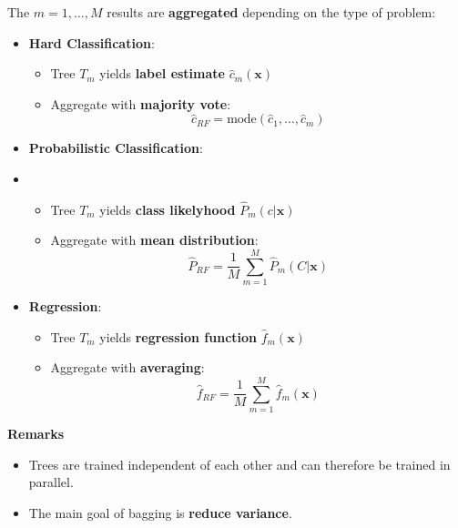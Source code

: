 \newpar{}
The $m=1,\ldots, M$ results are \textbf{aggregated} depending on the type of problem:
\begin{itemize}
    \item \textbf{Hard Classification}:
          \begin{itemize}
              \item Tree $T_m$ yields \textbf{label estimate} $\widehat{c}_m(\mathbf{x})$
              \item Aggregate with \textbf{majority vote}:
                    \noindent\begin{equation*}
                        \widehat{c}_{RF} = \mathrm{mode}(\widehat{c}_1,\ldots, \widehat{c}_m)
                    \end{equation*}
          \end{itemize}
    \item \textbf{Probabilistic Classification}:
    \item \begin{itemize}
              \item Tree $T_m$ yields \textbf{class likelyhood} $\widehat{P}_m(c|\mathbf{x})$
              \item Aggregate with \textbf{mean distribution}:
                    \noindent\begin{equation*}
                        \widehat{P}_{RF} = \frac{1}{M}\sum_{m=1}^{M}\widehat{P}_m(C|\mathbf{x})
                    \end{equation*}
          \end{itemize}
    \item \textbf{Regression}:
          \begin{itemize}
              \item Tree $T_m$ yields \textbf{regression function} $\widehat{f}_m(\mathbf{x})$
              \item Aggregate with \textbf{averaging}:
                    \noindent\begin{equation*}
                        \widehat{f}_{RF} = \frac{1}{M}\sum_{m=1}^{M}\widehat{f}_m(\mathbf{x})
                    \end{equation*}
          \end{itemize}
\end{itemize}

\textbf{Remarks}
\begin{itemize}
    \item Trees are trained independent of each other and can therefore be trained in parallel.
    \item The main goal of bagging is \textbf{reduce variance}.
\end{itemize}

